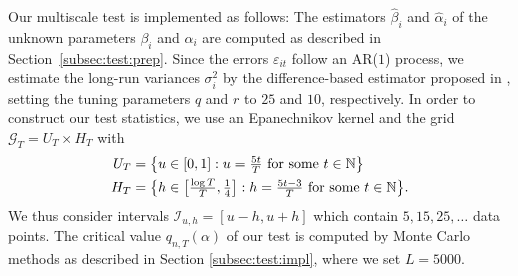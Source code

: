 \documentclass[a4paper,12pt]{article}
\makeatletter
\renewcommand{\eqref}[1]{\tagform@{\ref{#1}}}
\makeatother
\begin{document}
Our multiscale test is implemented as follows: The estimators $\widehat{\beta}_i$ and $\widehat{\alpha}_i$ of the unknown parameters $\beta_i$ and $\alpha_i$ are computed as described in Section~\ref{subsec:test:prep}. Since the errors $\varepsilon_{it}$ follow an AR($1$) process, we estimate the long-run variances $\sigma_i^2$ by the difference-based estimator proposed in \cite{KhismatullinaVogt2020}, setting the tuning parameters $q$ and $r$ to $25$ and $10$, respectively. 
In order to construct our test statistics, we use an Epanechnikov kernel and the grid $\mathcal{G}_T = U_T \times H_T$ with 
\begin{align*}
U_T & = \big\{ u \in [0,1]: u = \textstyle{\frac{5t}{T}} \text{ for some } t \in \mathbb{N} \big\} \\
H_T & = \big\{ h \in \big[ \textstyle{\frac{\log T}{T}}, \textstyle{\frac{1}{4}} \big]:  h = \textstyle{\frac{5 t -3}{T}} \text{ for some } t \in \mathbb{N} \big\}. 
\end{align*}
We thus consider intervals $\mathcal{I}_{u, h} = [u-h, u+h]$ which contain $5, 15, 25, \ldots$ data points. 
The critical value $q_{n,T}(\alpha)$ of our test is computed by Monte Carlo methods as described in Section \ref{subsec:test:impl}, where we set $L=5000$. 

\end{document}
